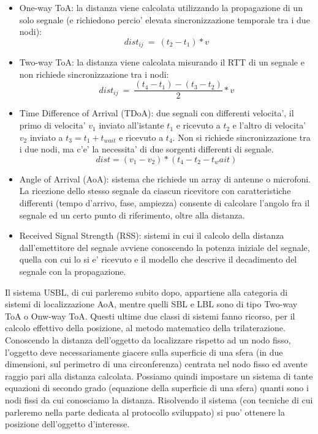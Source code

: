 \documentclass[Lau,binding=0.6cm]{sapthesis}
\begin{document}
\begin{itemize}
    \item One-way ToA: la distanza viene calcolata utilizzando la propagazione di un solo segnale (e richiedono percio' elevata sincronizzazione temporale tra i due nodi):
    \[dist_{ij}\ =\ (t_2-t_1)*v\]
    \item Two-way ToA: la distanza viene calcolata misurando il RTT di un segnale e non richiede sincronizzazione tra i nodi:
    \[dist_{ij}\ =\ \frac{(t_4-t_1)-(t_3-t_2)}{2}*v\]
    \item Time Difference of Arrival (TDoA): due segnali con differenti velocita', il primo di velocita' $v_1$ inviato all'istante $t_1$ e ricevuto a $t_2$ e l'altro di velocita' $v_2$ inviato a $t_3 = t_1 + t_{wait}$ e ricevuto a $t_4$. Non si richiede sincronizzazione tra i due nodi, ma c'e' la necessita' di due sorgenti differenti di segnale.
    \[dist = (v_1 - v_2)*(t_4 - t_2 - t_wait)\]
    \item Angle of Arrival (AoA): sistema che richiede un array di antenne o microfoni. La ricezione dello stesso segnale da ciascun ricevitore con caratteristiche differenti (tempo d'arrivo, fase, ampiezza) consente di calcolare l'angolo fra il segnale ed un certo punto di riferimento, oltre alla distanza.
    \item Received Signal Strength (RSS): sistemi in cui il calcolo della distanza dall'emettitore del segnale avviene conoscendo la potenza iniziale del segnale, quella con cui lo si e' ricevuto e il modello che descrive il decadimento del segnale con la propagazione.
\end{itemize}
Il sistema USBL, di cui parleremo subito dopo, appartiene alla categoria di sistemi di localizzazione AoA, mentre quelli SBL e LBL sono di tipo Two-way ToA o Onw-way ToA.
Questi ultime due classi di sistemi fanno ricorso, per il calcolo effettivo della posizione, al metodo matematico della trilaterazione.
Conoscendo la distanza dell'oggetto da localizzare rispetto ad un nodo fisso, l'oggetto deve necessariamente giacere sulla superficie di una sfera (in due dimensioni, sul perimetro di una circonferenza) centrata nel nodo fisso ed avente raggio pari alla distanza calcolata. Possiamo quindi impostare un sistema di tante equazioni di secondo grado (equazione della superficie di una sfera) quanti sono i nodi fissi da cui conosciamo la distanza. Risolvendo il sistema (con tecniche di cui parleremo nella parte dedicata al protocollo sviluppato) si puo' ottenere la posizione dell'oggetto d'interesse.
\end{document}
